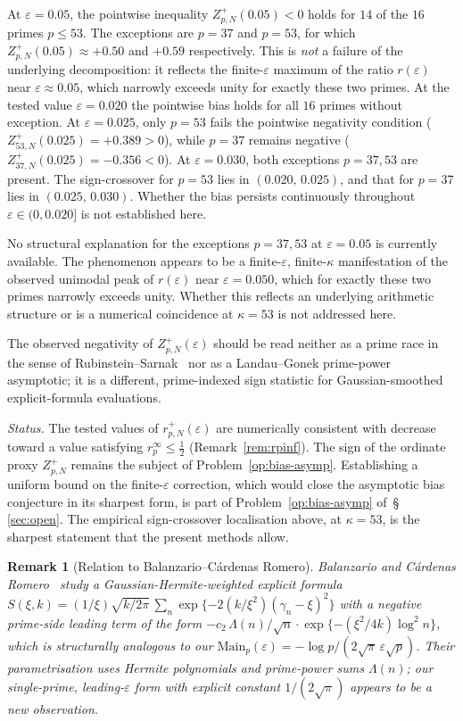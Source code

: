 \documentclass[11pt]{article}
\newtheorem*{remark}{Remark}
\begin{document}
At $\varepsilon=0.05$, the pointwise inequality
$Z_{p,N}^+(0.05)<0$ holds for $14$ of the $16$ primes
$p\le 53$.
The exceptions are $p=37$ and $p=53$, for which
$Z_{p,N}^+(0.05)\approx+0.50$ and $+0.59$ respectively.
This is \emph{not} a failure of the underlying decomposition: it
reflects the finite-$\varepsilon$ maximum of the ratio $r(\varepsilon)$
near $\varepsilon\approx 0.05$, which narrowly exceeds unity for
exactly these two primes.
At the tested value $\varepsilon=0.020$ the pointwise bias holds for
all $16$ primes without exception.
At $\varepsilon=0.025$, only $p=53$ fails the pointwise negativity
condition ($Z_{53,N}^+(0.025)=+0.389>0$), while $p=37$ remains
negative ($Z_{37,N}^+(0.025)=-0.356<0$).
At $\varepsilon=0.030$, both exceptions $p=37,53$ are present.
The sign-crossover for $p=53$ lies in $(0.020,\,0.025)$, and
that for $p=37$ lies in $(0.025,\,0.030)$.
Whether the bias persists continuously throughout
$\varepsilon\in(0,0.020]$ is not established here.

No structural explanation for the exceptions $p=37,53$ at
$\varepsilon=0.05$ is currently available.
The phenomenon appears to be a finite-$\varepsilon$, finite-$\kappa$
manifestation of the observed unimodal peak of $r(\varepsilon)$ near
$\varepsilon=0.050$, which for exactly these two
primes narrowly exceeds unity.
Whether this reflects an underlying arithmetic structure or is a
numerical coincidence at $\kappa=53$ is not addressed here.

The observed negativity of $Z_{p,N}^+(\varepsilon)$ should
be read neither as a prime race in the sense of
Rubinstein--Sarnak~\cite{RubinsteinSarnak} nor as a Landau--Gonek
prime-power asymptotic; it is a different, prime-indexed sign
statistic for Gaussian-smoothed explicit-formula evaluations.

\emph{Status.}
The tested values of $r^+_{p,N}(\varepsilon)$ are numerically consistent
with decrease toward a value satisfying $r_p^{\infty}\le\tfrac12$
(Remark~\ref{rem:rpinf}).
The sign of the ordinate proxy $Z_{p,N}^+$ remains the
subject of Problem~\ref{op:bias-asymp}.
Establishing a uniform bound on the finite-$\varepsilon$ correction,
which would close the asymptotic bias conjecture in its sharpest form,
is part of Problem~\ref{op:bias-asymp} of~\S\,\ref{sec:open}.
The empirical sign-crossover localisation above, at $\kappa=53$, is
the sharpest statement that the present methods allow.


\begin{remark}[Relation to Balanzario--C\'ardenas Romero]
Balanzario and C\'ardenas Romero~\cite{BalanzarioCardenas25}
study a Gaussian-Hermite-weighted explicit formula
$S(\xi,k) = (1/\xi)\sqrt{k/2\pi}\,
\sum_n \exp\{-2(k/\xi^2)(\gamma_n - \xi)^2\}$
with a negative prime-side leading term of the form
$-c_2\,\Lambda(n)/\sqrt{n}\cdot\exp\{-(\xi^2/4k)\log^2 n\}$,
which is structurally analogous to our
$\mathrm{Main}_p(\varepsilon) = -\log p/(2\sqrt{\pi}\,\varepsilon\sqrt{p})$.
Their parametrisation uses Hermite polynomials and prime-power
sums $\Lambda(n)$; our single-prime, leading-$\varepsilon$ form
with explicit constant $1/(2\sqrt{\pi})$ appears to be a new
observation.
\end{remark}
\end{document}
